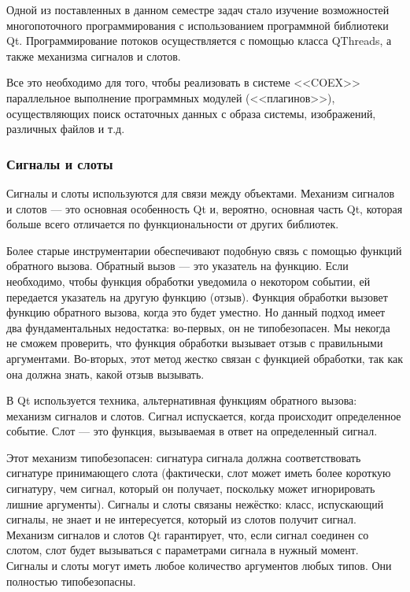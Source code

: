 Одной из поставленных в данном семестре задач стало изучение возможностей многопоточного программирования с использованием программной библиотеки Qt. Программирование потоков осуществляется с помощью класса QThreads, а также механизма сигналов и слотов.

Все это необходимо для того, чтобы реализовать в системе <<COEX>> параллельное выполнение программных модулей (<<плагинов>>), осуществляющих поиск остаточных данных с образа системы, изображений, различных файлов и т.д. 

\subsubsection{ Сигналы и слоты }

Сигналы и слоты используются для связи между объектами. Механизм сигналов и слотов --- это основная особенность Qt и, вероятно, основная часть Qt, которая больше всего отличается по функциональности от других библиотек.

Более старые инструментарии обеспечивают подобную связь с помощью функций обратного вызова. Обратный вызов --- это указатель на функцию. Если необходимо, чтобы функция обработки уведомила о некотором событии, ей передается указатель на другую функцию (отзыв). Функция обработки вызовет функцию обратного вызова, когда это будет уместно. Но данный подход имеет два фундаментальных недостатка: во-первых, он не типобезопасен. Мы некогда не сможем проверить, что функция обработки вызывает отзыв с правильными аргументами. Во-вторых, этот метод жестко связан с функцией обработки, так как она должна знать, какой отзыв вызывать.

В Qt используется техника, альтернативная функциям обратного вызова: механизм сигналов и слотов. Сигнал испускается, когда происходит определенное событие. Слот --- это функция, вызываемая в ответ на определенный сигнал.

Этот механизм типобезопасен: сигнатура сигнала должна соответствовать сигнатуре принимающего слота (фактически, слот может иметь более короткую сигнатуру, чем сигнал, который он получает, поскольку может игнорировать лишние аргументы). Сигналы и слоты связаны нежёстко: класс, испускающий сигналы, не знает и не интересуется, который из слотов получит сигнал. Механизм сигналов и слотов Qt гарантирует, что, если сигнал соединен со слотом, слот будет вызываться с параметрами сигнала в нужный момент. Сигналы и слоты могут иметь любое количество аргументов любых типов. Они полностью типобезопасны.

